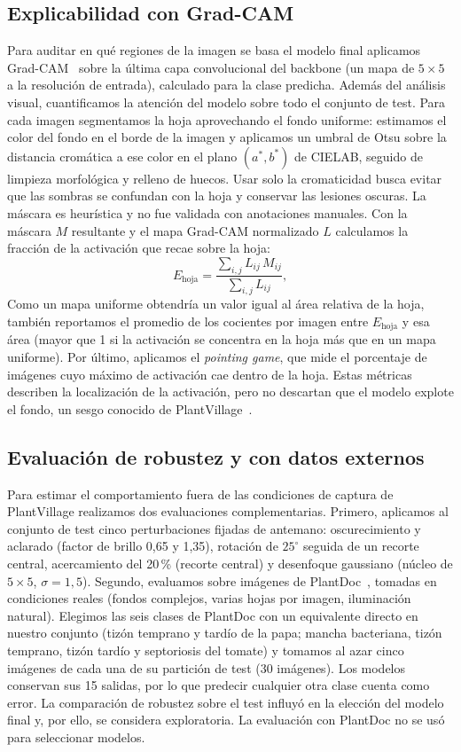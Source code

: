 \subsection{Explicabilidad con Grad-CAM}
\label{subsec:gradcam}
Para auditar en qué regiones de la imagen se basa el modelo final aplicamos
Grad-CAM~\cite{selvaraju2017gradcam} sobre la última capa convolucional del backbone (un mapa
de $5\times5$ a la resolución de entrada), calculado para la clase predicha. Además del
análisis visual, cuantificamos la atención del modelo sobre todo el conjunto de test. Para
cada imagen segmentamos la hoja aprovechando el fondo uniforme: estimamos el color del fondo
en el borde de la imagen y aplicamos un umbral de Otsu sobre la distancia cromática a ese
color en el plano $(a^*, b^*)$ de CIELAB, seguido de limpieza morfológica y relleno de
huecos. Usar solo la cromaticidad busca evitar que las sombras se confundan con la hoja y conservar
las lesiones oscuras. La máscara es heurística y no fue validada con anotaciones manuales. Con la máscara $M$
resultante y el mapa Grad-CAM normalizado $L$ calculamos la fracción de la activación que recae
sobre la hoja:
\begin{equation}
  E_{\text{hoja}} = \frac{\sum_{i,j} L_{ij}\,M_{ij}}{\sum_{i,j} L_{ij}},
\end{equation}
Como un mapa uniforme obtendría un valor igual al área relativa de la hoja, también reportamos
el promedio de los cocientes por imagen entre $E_{\text{hoja}}$ y esa área (mayor que 1 si
la activación se concentra en la hoja más que en un mapa uniforme). Por último, aplicamos el \emph{pointing game}, que mide
el porcentaje de imágenes cuyo máximo de activación cae dentro de la hoja. Estas métricas
describen la localización de la activación, pero no descartan que el modelo explote el fondo,
un sesgo conocido de PlantVillage~\cite{noyan2022uncovering}.

\subsection{Evaluación de robustez y con datos externos}
\label{subsec:robustez_metodo}
Para estimar el comportamiento fuera de las condiciones de captura de PlantVillage realizamos
dos evaluaciones complementarias. Primero,
aplicamos al conjunto de test cinco perturbaciones fijadas de antemano: oscurecimiento y
aclarado (factor de brillo 0,65 y 1,35), rotación de $25^\circ$ seguida de un recorte central,
acercamiento del 20\,\% (recorte central) y desenfoque gaussiano (núcleo de $5\times5$,
$\sigma=1{,}5$). Segundo, evaluamos sobre imágenes de PlantDoc~\cite{singh2020plantdoc},
tomadas en condiciones reales (fondos complejos, varias hojas por imagen, iluminación
natural). Elegimos las seis clases de PlantDoc con un equivalente directo en nuestro conjunto
(tizón temprano y tardío de la papa; mancha bacteriana, tizón temprano, tizón tardío y
septoriosis del tomate) y tomamos al azar cinco imágenes de cada una de su partición de test
(30 imágenes). Los modelos conservan sus 15 salidas, por lo que predecir cualquier otra clase
cuenta como error. La comparación de robustez sobre el test influyó en la elección del
modelo final y, por ello, se considera exploratoria. La evaluación con PlantDoc no se usó
para seleccionar modelos.

